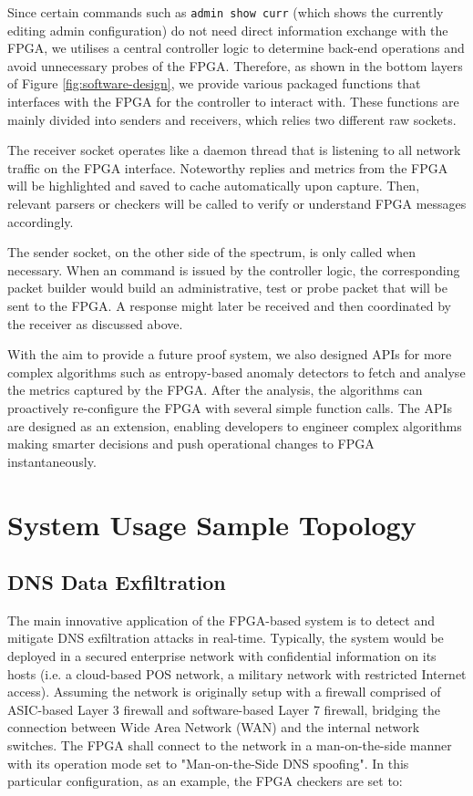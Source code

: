 \documentclass[a4paper]{report}
\newcommand{\code}{\texttt}
\begin{document}
Since certain commands such as \code{admin show curr} (which shows the currently editing admin configuration) do not need direct information exchange with the FPGA, we utilises a central controller logic to determine back-end operations and avoid unnecessary probes of the FPGA. Therefore, as shown in the bottom layers of Figure \ref{fig:software-design}, we provide various packaged functions that interfaces with the FPGA for the controller to interact with. These functions are mainly divided into senders and receivers, which relies two different raw sockets.

The receiver socket operates like a daemon thread that is listening to all network traffic on the FPGA interface. Noteworthy replies and metrics from the FPGA will be highlighted and saved to cache automatically upon capture. Then, relevant parsers or checkers will be called to verify or understand FPGA messages accordingly. 

The sender socket, on the other side of the spectrum, is only called when necessary. When an command is issued by the controller logic, the corresponding packet builder would build an administrative, test or probe packet that will be sent to the FPGA. A response might later be received and then coordinated by the receiver as discussed above.

With the aim to provide a future proof system, we also designed APIs for more complex algorithms such as entropy-based anomaly detectors to fetch and analyse the metrics captured by the FPGA. After the analysis, the algorithms can proactively re-configure the FPGA with several simple function calls. The APIs are designed as an extension, enabling developers to engineer complex algorithms making smarter decisions and push operational changes to FPGA instantaneously.

\section{System Usage Sample Topology}

\subsection{DNS Data Exfiltration}

The main innovative application of the FPGA-based system is to detect and mitigate DNS exfiltration attacks in real-time. Typically, the system would be deployed in a secured enterprise network with confidential information on its hosts (i.e. a cloud-based POS network, a military network with restricted Internet access). Assuming the network is originally setup with a firewall comprised of ASIC-based Layer 3 firewall and software-based Layer 7 firewall, bridging the connection between Wide Area Network (WAN) and the internal network switches. The FPGA shall connect to the network in a man-on-the-side manner with its operation mode set to "Man-on-the-Side DNS spoofing".  In this particular configuration, as an example, the FPGA checkers are set to:
\end{document}
